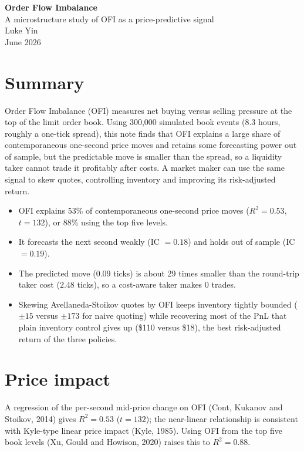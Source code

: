 \documentclass[11pt]{article}
\begin{document}
\begin{center}
  {\LARGE\bfseries Order Flow Imbalance}\\[4pt]
  {\normalsize A microstructure study of OFI as a price-predictive signal}\\[6pt]
  {\normalsize Luke Yin}\\[2pt]
  {\small June 2026}
\end{center}
\vspace{4pt}

\section*{Summary}

Order Flow Imbalance (OFI) measures net buying versus selling pressure at the top of
the limit order book. Using 300{,}000 simulated book events (8.3 hours, roughly a
one-tick spread), this note finds that OFI explains a large share of contemporaneous
one-second price moves and retains some forecasting power out of sample, but the
predictable move is smaller than the spread, so a liquidity taker cannot trade it
profitably after costs. A market maker can use the same signal to skew quotes,
controlling inventory and improving its risk-adjusted return.

\begin{itemize}\setlength{\itemsep}{2pt}
\item OFI explains 53\% of contemporaneous one-second price moves ($R^2 = 0.53$,
      $t = 132$), or 88\% using the top five levels.
\item It forecasts the next second weakly (IC $= 0.18$) and holds out of sample
      (IC $= 0.19$).
\item The predicted move ($0.09$ ticks) is about 29 times smaller than the round-trip
      taker cost ($2.48$ ticks), so a cost-aware taker makes 0 trades.
\item Skewing Avellaneda-Stoikov quotes by OFI keeps inventory tightly bounded
      ($\pm 15$ versus $\pm 173$ for naive quoting) while recovering most of the PnL that
      plain inventory control gives up (\$110 versus \$18), the best risk-adjusted return
      of the three policies.
\end{itemize}

\section{Price impact}

A regression of the per-second mid-price change on OFI (Cont, Kukanov and Stoikov,
2014) gives $R^2 = 0.53$ ($t = 132$); the near-linear relationship is consistent with
Kyle-type linear price impact (Kyle, 1985). Using OFI from the top five book levels
(Xu, Gould and Howison, 2020) raises this to $R^2 = 0.88$.
\end{document}

